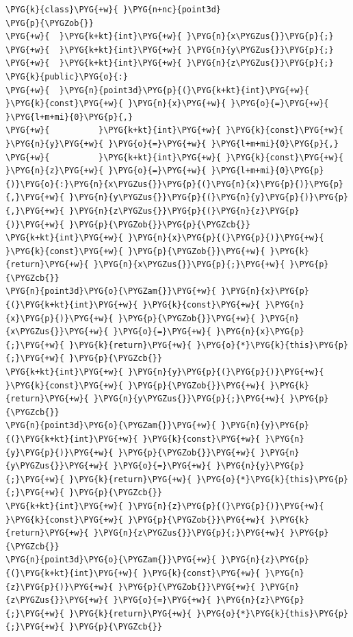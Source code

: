 \begin{codeblockbg}
\begin{Verbatim}[commandchars=\\\{\},breaklines=true,breakanywhere=true,fontsize=\codefont,xleftmargin=17bp]
\PYG{k}{class}\PYG{+w}{ }\PYG{n+nc}{point3d}
\PYG{p}{\PYGZob{}}
\PYG{+w}{  }\PYG{k+kt}{int}\PYG{+w}{ }\PYG{n}{x\PYGZus{}}\PYG{p}{;}
\PYG{+w}{  }\PYG{k+kt}{int}\PYG{+w}{ }\PYG{n}{y\PYGZus{}}\PYG{p}{;}
\PYG{+w}{  }\PYG{k+kt}{int}\PYG{+w}{ }\PYG{n}{z\PYGZus{}}\PYG{p}{;}
\PYG{k}{public}\PYG{o}{:}
\PYG{+w}{  }\PYG{n}{point3d}\PYG{p}{(}\PYG{k+kt}{int}\PYG{+w}{ }\PYG{k}{const}\PYG{+w}{ }\PYG{n}{x}\PYG{+w}{ }\PYG{o}{=}\PYG{+w}{ }\PYG{l+m+mi}{0}\PYG{p}{,}
\PYG{+w}{          }\PYG{k+kt}{int}\PYG{+w}{ }\PYG{k}{const}\PYG{+w}{ }\PYG{n}{y}\PYG{+w}{ }\PYG{o}{=}\PYG{+w}{ }\PYG{l+m+mi}{0}\PYG{p}{,}
\PYG{+w}{          }\PYG{k+kt}{int}\PYG{+w}{ }\PYG{k}{const}\PYG{+w}{ }\PYG{n}{z}\PYG{+w}{ }\PYG{o}{=}\PYG{+w}{ }\PYG{l+m+mi}{0}\PYG{p}{)}\PYG{o}{:}\PYG{n}{x\PYGZus{}}\PYG{p}{(}\PYG{n}{x}\PYG{p}{)}\PYG{p}{,}\PYG{+w}{ }\PYG{n}{y\PYGZus{}}\PYG{p}{(}\PYG{n}{y}\PYG{p}{)}\PYG{p}{,}\PYG{+w}{ }\PYG{n}{z\PYGZus{}}\PYG{p}{(}\PYG{n}{z}\PYG{p}{)}\PYG{+w}{ }\PYG{p}{\PYGZob{}}\PYG{p}{\PYGZcb{}}
\PYG{k+kt}{int}\PYG{+w}{ }\PYG{n}{x}\PYG{p}{(}\PYG{p}{)}\PYG{+w}{ }\PYG{k}{const}\PYG{+w}{ }\PYG{p}{\PYGZob{}}\PYG{+w}{ }\PYG{k}{return}\PYG{+w}{ }\PYG{n}{x\PYGZus{}}\PYG{p}{;}\PYG{+w}{ }\PYG{p}{\PYGZcb{}}
\PYG{n}{point3d}\PYG{o}{\PYGZam{}}\PYG{+w}{ }\PYG{n}{x}\PYG{p}{(}\PYG{k+kt}{int}\PYG{+w}{ }\PYG{k}{const}\PYG{+w}{ }\PYG{n}{x}\PYG{p}{)}\PYG{+w}{ }\PYG{p}{\PYGZob{}}\PYG{+w}{ }\PYG{n}{x\PYGZus{}}\PYG{+w}{ }\PYG{o}{=}\PYG{+w}{ }\PYG{n}{x}\PYG{p}{;}\PYG{+w}{ }\PYG{k}{return}\PYG{+w}{ }\PYG{o}{*}\PYG{k}{this}\PYG{p}{;}\PYG{+w}{ }\PYG{p}{\PYGZcb{}}
\PYG{k+kt}{int}\PYG{+w}{ }\PYG{n}{y}\PYG{p}{(}\PYG{p}{)}\PYG{+w}{ }\PYG{k}{const}\PYG{+w}{ }\PYG{p}{\PYGZob{}}\PYG{+w}{ }\PYG{k}{return}\PYG{+w}{ }\PYG{n}{y\PYGZus{}}\PYG{p}{;}\PYG{+w}{ }\PYG{p}{\PYGZcb{}}
\PYG{n}{point3d}\PYG{o}{\PYGZam{}}\PYG{+w}{ }\PYG{n}{y}\PYG{p}{(}\PYG{k+kt}{int}\PYG{+w}{ }\PYG{k}{const}\PYG{+w}{ }\PYG{n}{y}\PYG{p}{)}\PYG{+w}{ }\PYG{p}{\PYGZob{}}\PYG{+w}{ }\PYG{n}{y\PYGZus{}}\PYG{+w}{ }\PYG{o}{=}\PYG{+w}{ }\PYG{n}{y}\PYG{p}{;}\PYG{+w}{ }\PYG{k}{return}\PYG{+w}{ }\PYG{o}{*}\PYG{k}{this}\PYG{p}{;}\PYG{+w}{ }\PYG{p}{\PYGZcb{}}
\PYG{k+kt}{int}\PYG{+w}{ }\PYG{n}{z}\PYG{p}{(}\PYG{p}{)}\PYG{+w}{ }\PYG{k}{const}\PYG{+w}{ }\PYG{p}{\PYGZob{}}\PYG{+w}{ }\PYG{k}{return}\PYG{+w}{ }\PYG{n}{z\PYGZus{}}\PYG{p}{;}\PYG{+w}{ }\PYG{p}{\PYGZcb{}}
\PYG{n}{point3d}\PYG{o}{\PYGZam{}}\PYG{+w}{ }\PYG{n}{z}\PYG{p}{(}\PYG{k+kt}{int}\PYG{+w}{ }\PYG{k}{const}\PYG{+w}{ }\PYG{n}{z}\PYG{p}{)}\PYG{+w}{ }\PYG{p}{\PYGZob{}}\PYG{+w}{ }\PYG{n}{z\PYGZus{}}\PYG{+w}{ }\PYG{o}{=}\PYG{+w}{ }\PYG{n}{z}\PYG{p}{;}\PYG{+w}{ }\PYG{k}{return}\PYG{+w}{ }\PYG{o}{*}\PYG{k}{this}\PYG{p}{;}\PYG{+w}{ }\PYG{p}{\PYGZcb{}}

\end{Verbatim}
\end{codeblockbg}
